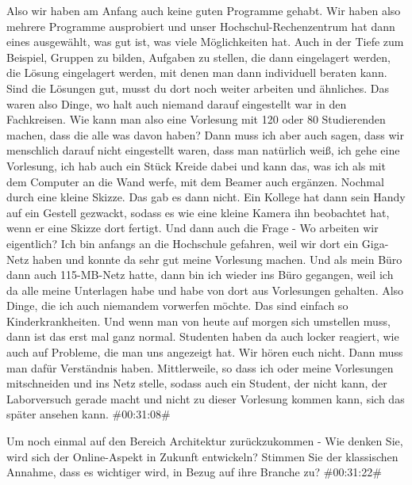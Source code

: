 \documentclass[a4paper, 12pt]{scrartcl}
\begin{document}
\begin{description}
\Andre Also wir haben am Anfang auch keine guten Programme gehabt. Wir haben also mehrere Programme ausprobiert und unser Hochschul-Rechenzentrum hat dann eines ausgewählt, was gut ist, was viele Möglichkeiten hat. Auch in der Tiefe zum Beispiel, Gruppen zu bilden, Aufgaben zu stellen, die dann eingelagert werden, die Lösung eingelagert werden, mit denen man dann individuell beraten kann. Sind die Lösungen gut, musst du dort noch weiter arbeiten und ähnliches. Das waren also Dinge, wo halt auch niemand darauf eingestellt war in den Fachkreisen. Wie kann man also eine Vorlesung mit 120 oder 80 Studierenden machen, dass die alle was davon haben? Dann muss ich aber auch sagen, dass wir menschlich darauf nicht eingestellt waren, dass man natürlich weiß, ich gehe eine Vorlesung, ich hab auch ein Stück Kreide dabei und kann das, was ich als mit dem Computer an die Wand werfe, mit dem Beamer auch ergänzen. Nochmal durch eine kleine Skizze. Das gab es dann nicht. Ein Kollege hat dann sein Handy auf ein Gestell gezwackt, sodass es wie eine kleine Kamera ihn beobachtet hat, wenn er eine Skizze dort fertigt. Und dann auch die Frage - Wo arbeiten wir eigentlich? Ich bin anfangs an die Hochschule gefahren, weil wir dort ein Giga-Netz haben und konnte da sehr gut meine Vorlesung machen. Und als mein Büro dann auch 115-MB-Netz hatte, dann bin ich wieder ins Büro gegangen, weil ich da alle meine Unterlagen habe und habe von dort aus Vorlesungen gehalten. Also Dinge, die ich auch niemandem vorwerfen möchte. Das sind einfach so Kinderkrankheiten. Und wenn man von heute auf morgen sich umstellen muss, dann ist das erst mal ganz normal. Studenten haben da auch locker reagiert, wie auch auf Probleme, die man uns angezeigt hat. Wir hören euch nicht. Dann muss man dafür Verständnis haben. Mittlerweile, so dass ich oder meine Vorlesungen mitschneiden und ins Netz stelle, sodass auch ein Student, der nicht kann, der Laborversuch gerade macht und nicht zu dieser Vorlesung kommen kann, sich das später ansehen kann. \#00:31:08\#

\Fabian Um noch einmal auf den Bereich Architektur zurückzukommen - Wie denken Sie, wird sich der Online-Aspekt in Zukunft entwickeln? Stimmen Sie der klassischen Annahme, dass es wichtiger wird, in Bezug auf ihre Branche zu? \#00:31:22\#


\end{description}
\end{document}
